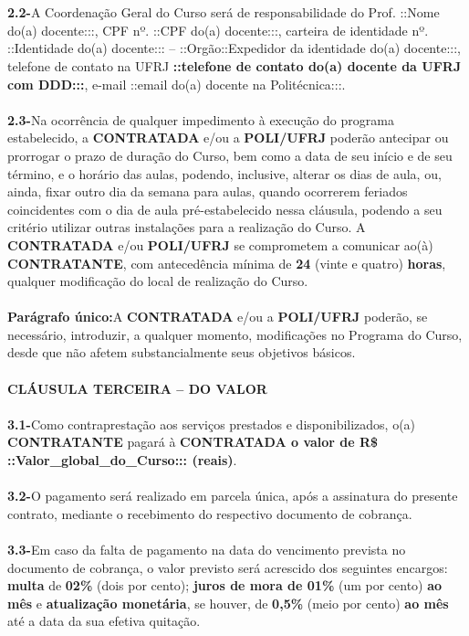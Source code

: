 \documentclass[a4paper,7.5pt]{article}
\begin{document}
\\\\
{\bf2.2-}\indent A Coordenação Geral do Curso será de responsabilidade do Prof. ::Nome do(a) docente:::, CPF nº. ::CPF do(a) docente:::, carteira de identidade nº. ::Identidade do(a) docente::: – ::Orgão::Expedidor da identidade do(a) docente:::, telefone de contato na UFRJ {\bf::telefone de contato do(a) docente da UFRJ com DDD:::}, e-mail ::email do(a) docente na Politécnica:::.
\\\\
{\bf2.3-}\indent Na ocorrência de qualquer impedimento à execução do programa estabelecido, a {\bf CONTRATADA} e/ou a {\bf POLI/UFRJ} poderão antecipar ou prorrogar o prazo de duração do Curso, bem como a data de seu início e de seu término, e o horário das aulas, podendo, inclusive, alterar os dias de aula, ou, ainda, fixar outro dia da semana para aulas, quando ocorrerem feriados coincidentes com o dia de aula pré-estabelecido nessa cláusula, podendo a seu critério utilizar outras instalações para a realização do Curso. A {\bf CONTRATADA} e/ou {\bf POLI/UFRJ} se comprometem a comunicar ao(à) {\bf CONTRATANTE}, com antecedência mínima de {\bf 24} (vinte e quatro) {\bf horas}, qualquer modificação do local de realização do Curso.
\\\\
{\bf Parágrafo único:}\indent A {\bf CONTRATADA} e/ou a {\bf POLI/UFRJ} poderão, se necessário, introduzir, a qualquer momento, modificações no Programa do \indent\indent\indent\indent\indent Curso, desde que não afetem substancialmente seus objetivos básicos.
\\\\
{\bf CLÁUSULA TERCEIRA – DO VALOR}
\\\\
{\bf3.1-}\indent Como contraprestação aos serviços prestados e disponibilizados, o(a) {\bf CONTRATANTE} pagará à {\bf CONTRATADA o valor de R\$ ::Valor\_global\_do\_Curso::: (reais)}.
\\\\
{\bf3.2-}\indent O pagamento será realizado em parcela única, após a assinatura do presente contrato, mediante o recebimento do respectivo documento de cobrança.
\\\\
{\bf3.3-}\indent Em caso da falta de pagamento na data do vencimento prevista no documento de cobrança, o valor previsto será acrescido dos seguintes encargos: {\bf multa} de {\bf 02\%} (dois por cento); {\bf juros de mora de 01\%} (um por cento) {\bf ao mês} e {\bf atualização monetária}, se houver, de {\bf0,5\%} (meio por cento) {\bf ao mês} até a data da sua efetiva quitação.
\end{document}
